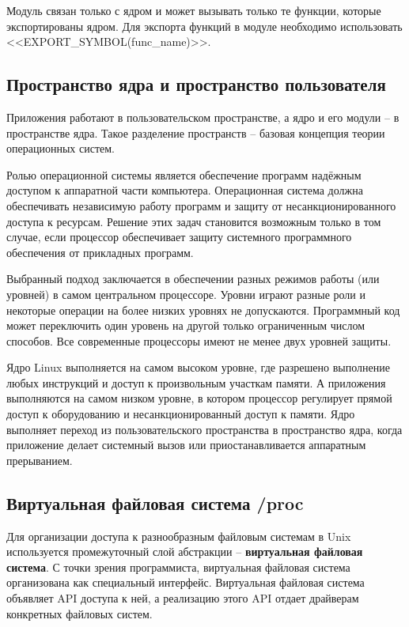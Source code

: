 Модуль связан только с ядром и может вызывать только те функции, которые экспортированы ядром. Для экспорта функций в модуле необходимо использовать <<EXPORT\_SYMBOL(func\_name)>>.

\subsection{Пространство ядра и пространство пользователя}

Приложения работают в пользовательском пространстве, а ядро и его модули -- в пространстве ядра. Такое разделение пространств -- базовая концепция теории операционных систем.

Ролью операционной системы является обеспечение программ надёжным доступом к аппаратной части компьютера. Операционная система должна обеспечивать независимую работу программ и защиту от несанкционированного доступа к ресурсам. Решение этих задач становится возможным только в том случае, если процессор обеспечивает защиту системного программного обеспечения от прикладных программ.

Выбранный подход заключается в обеспечении разных режимов работы (или уровней) в самом центральном процессоре. Уровни играют разные роли и некоторые операции на более низких уровнях не допускаются. Программный код может переключить один уровень на другой только ограниченным числом способов. Все современные процессоры имеют не менее двух уровней защиты.

Ядро Linux выполняется на самом высоком уровне, где разрешено выполнение любых инструкций и доступ к произвольным участкам памяти. А приложения выполняются на самом низком уровне, в котором процессор регулирует прямой доступ к оборудованию и несанкционированный доступ к памяти. Ядро выполняет переход из пользовательского пространства в пространство ядра, когда приложение делает системный вызов или приостанавливается аппаратным прерыванием.

\subsection{Виртуальная файловая система /proc}

Для организации доступа к разнообразным файловым системам в Unix используется промежуточный слой абстракции -- \textbf{виртуальная файловая система}. С точки зрения программиста, виртуальная файловая система организована как специальный интерфейс. Виртуальная файловая система объявляет API доступа к ней, а реализацию этого API отдает драйверам конкретных файловых систем.

